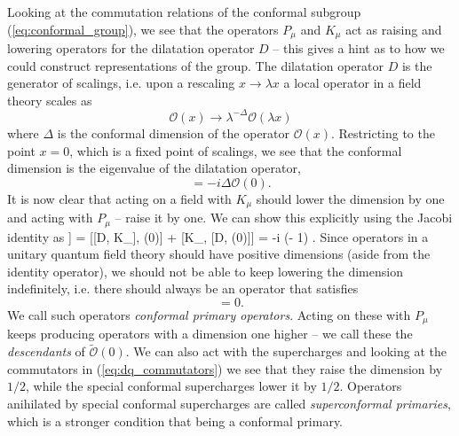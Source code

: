 Looking at the commutation relations of the conformal subgroup (\ref{eq:conformal_group}), we see that the operators $P_\mu$ and $K_\mu$ act as raising and lowering operators for the dilatation operator $D$ -- this gives a hint as to how we could construct representations of the group. 
The dilatation operator $D$ is the generator of scalings, i.e. upon a rescaling $x \rightarrow \lambda x$ a local operator in a field theory scales as 
\begin{equation}
	\mathcal{O}(x) \rightarrow \lambda^{-\Delta} \mathcal{O}(\lambda x)
\end{equation}
where $\Delta$ is the conformal dimension of the operator $\mathcal{O}(x)$. 
Restricting to the point $x = 0$, which is a fixed point of scalings, we see that the conformal dimension is the eigenvalue of the dilatation operator,
\begin{equation}
	[D,\mathcal{O}(0)] = -i \Delta \mathcal{O}(0).
\end{equation}
It is now clear that acting on a field with $K_\mu$ should lower the dimension by one and acting with $P_\mu$ -- raise it by one. 
We can show this explicitly using the Jacobi identity as
\beq
	[D, [K_\mu, \mathcal{O}(0)]] = [[D, K_\mu], (0)] + [K_\mu, [D, (0)]] = -i (\Delta - 1) \; [K_\mu, \mathcal{O}(0)].
\eeq
Since operators in a unitary quantum field theory should have positive dimensions (aside from the identity operator), we should not be able to keep lowering the dimension indefinitely, i.e. there should always be an operator that satisfies
\begin{equation}
	[K_\mu, \tilde{\mathcal{O}}(0)] = 0.
\end{equation} 
We call such operators \emph{conformal primary operators}. 
Acting on these with $P_\mu$ keeps producing operators with a dimension one higher -- we call these the \emph{descendants} of $\tilde{\mathcal{O}}(0)$. 
We can also act with the supercharges and looking at the commutators in (\ref{eq:dq_commutators}) we see that they raise the dimension by $1/2$, while the special conformal supercharges lower it by $1/2$. 
Operators anihilated by special conformal supercharges are called \emph{superconformal primaries}, which is a stronger condition that being a conformal primary.

